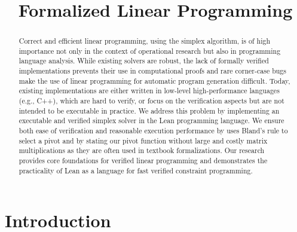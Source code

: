\documentclass[11pt]{article} %
\title{Formalized Linear Programming}
\date{}
\begin{document}

\lstset{language=lean}
\lstset{basicstyle=\normalsize}
\maketitle
{}
\begin{abstract}
Correct and efficient linear programming, using the simplex
algorithm, is of high importance not only in the context of
operational research but also in programming language analysis.
While existing solvers are robust, the lack of formally verified
implementations prevents their use in computational proofs and
rare corner-case bugs make the use of linear programming for
automatic program generation difficult.
Today, existing implementations are either written in low-level
high-performance languages (e.g., C++), which are hard to verify, or
focus on the verification aspects but are not intended to be executable in practice.
We address this problem by implementing an executable and verified
simplex solver in the Lean programming language.
We ensure both ease of verification and reasonable execution
performance by uses Bland's rule to select a pivot and by stating our
pivot function without large and costly matrix multiplications as
they are often used in textbook formalizations.
Our research provides core foundations for verified linear
programming and demonstrates the practicality of Lean as a language
for fast verified constraint programming.

\end{abstract}

\section{Introduction}
\end{document}

